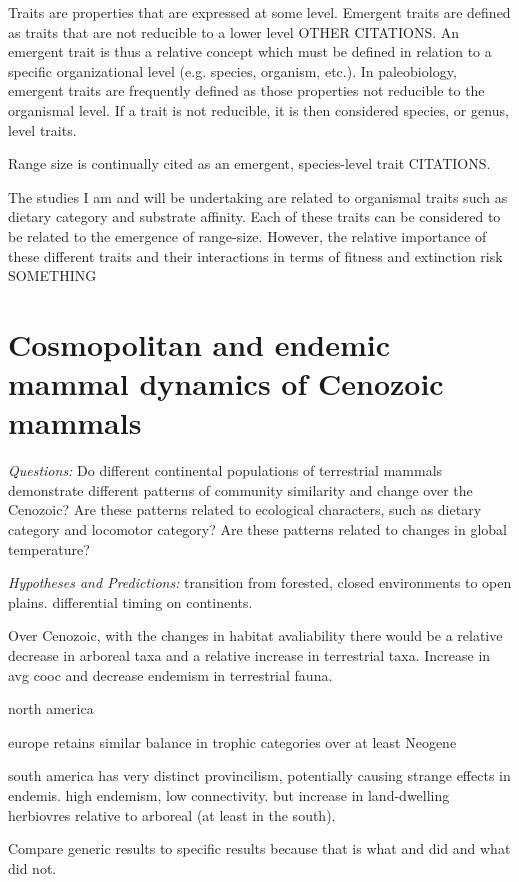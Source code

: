\documentclass[12pt,letterpaper]{article}
\begin{document}
Traits are properties that are expressed at some level. Emergent traits are defined as traits that are not reducible to a lower level \citep{Jablonski2008a}OTHER CITATIONS. An emergent trait is thus a relative concept which must be defined in relation to a specific organizational level (e.g. species, organism, etc.). In paleobiology, emergent traits are frequently defined as those properties not reducible to the organismal level. If a trait is not reducible, it is then considered species, or genus, level traits.

Range size is continually cited as an emergent, species-level trait CITATIONS. 

The studies I am and will be undertaking are related to organismal traits such as dietary category and substrate affinity. Each of these traits can be considered to be related to the emergence of range-size. However, the relative importance of these different traits and their interactions in terms of fitness and extinction risk SOMETHING


\section{Cosmopolitan and endemic mammal dynamics of Cenozoic mammals}

\textit{Questions:} Do different continental populations of terrestrial mammals demonstrate different patterns of community similarity and change over the Cenozoic? Are these patterns related to ecological characters, such as dietary category and locomotor category? Are these patterns related to changes in global temperature?

\textit{Hypotheses and Predictions:}
transition from forested, closed environments to open plains. differential timing on continents.

Over Cenozoic, with the changes in habitat avaliability there would be a relative decrease in arboreal taxa and a relative increase in terrestrial taxa. Increase in avg cooc and decrease endemism in terrestrial fauna.

north america

europe retains similar balance in trophic categories over at least Neogene

south america has very distinct provincilism, potentially causing strange effects in endemis. high endemism, low connectivity. but increase in land-dwelling herbiovres relative to arboreal (at least in the south).

Compare generic results to specific results because that is what \citet{Jernvall2002} and \citet{Jernvall2004} did and what \citet{Tomiya2013} did not.
\end{document}
